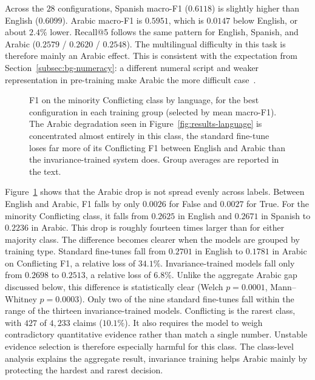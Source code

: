 Across the $28$ configurations, Spanish macro-F1 ($0.6118$) is slightly higher than English
($0.6099$). Arabic macro-F1 is $0.5951$, which is $0.0147$ below English, or about $2.4\%$ lower.
Recall@5 follows the same pattern for English, Spanish, and Arabic ($0.2579$ / $0.2620$ / $0.2548$).
The multilingual difficulty in this task is therefore mainly an Arabic effect. This is consistent
with the expectation from Section~\ref{subsec:bg-numeracy}: a different numeral script and weaker
representation in pre-training make Arabic the more difficult case~\cite{reddy2026effectscriptsformatsllm,Qi_2023}.

\begin{figure}[htbp]
  \centering
  
  \caption{F1 on the minority \textsf{Conflicting} class by language, for the best configuration in
  each training group (selected by mean macro-F1). The Arabic degradation seen in
  Figure~\ref{fig:results-language} is concentrated almost entirely in this class, the standard
  fine-tune loses far more of its \textsf{Conflicting} F1 between English and Arabic than the
  invariance-trained system does. Group averages are reported in the text.}
  \label{fig:results-conflicting}
\end{figure}

Figure~\ref{fig:results-conflicting} shows that the Arabic drop is not spread evenly across labels.
Between English and Arabic, F1 falls by only $0.0026$ for \textsf{False} and $0.0027$ for
\textsf{True}. For the minority \textsf{Conflicting} class, it falls from $0.2625$ in English and
$0.2671$ in Spanish to $0.2236$ in Arabic. This drop is roughly fourteen times larger than for either
majority class. The difference becomes clearer when the models are grouped by training type.
Standard fine-tunes fall from $0.2701$ in English to $0.1781$ in Arabic on \textsf{Conflicting} F1,
a relative loss of $34.1\%$. Invariance-trained models fall only from $0.2698$ to $0.2513$, a relative
loss of $6.8\%$. Unlike the aggregate Arabic gap discussed below, this difference is statistically
clear (Welch $p = 0.0001$, Mann--Whitney $p = 0.0003$). Only two of the nine standard fine-tunes fall
within the range of the thirteen invariance-trained models. \textsf{Conflicting} is the rarest class,
with $427$ of $4{,}233$ claims ($10.1\%$). It also requires the model to weigh contradictory
quantitative evidence rather than match a single number. Unstable evidence selection is therefore
especially harmful for this class. The class-level analysis explains the aggregate result,
invariance training helps Arabic mainly by protecting the hardest and rarest decision.

